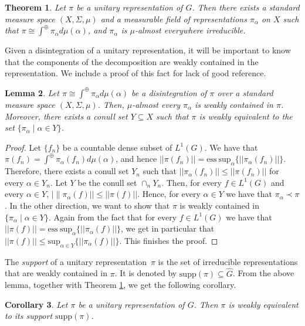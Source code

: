 \documentclass[12pt,reqno]{amsart}
\newtheorem{theorem}{Theorem}[section]
\newtheorem{lemma}[theorem]{Lemma}
\newtheorem{corollary}[theorem]{Corollary}
\theoremstyle{definition}
\begin{document}
\begin{theorem}\cite[Theorem~7.29-7.30]{Folland}\label{thm:disintegration of unirpes}
    Let $\pi$ be a unitary representation of $G$. Then there exists a standard measure space $(X,\Sigma,\mu)$ and a measurable field of representations $\pi_{\alpha}$ on $X$ such that $\pi \cong \int^{\oplus}\pi_{\alpha}d\mu(\alpha)$, and $\pi_\alpha$ is $\mu$-almost everywhere irreducible.
\end{theorem}
Given a disintegration of a unitary representation, it will be important to know that the components of the decomposition are weakly contained in the representation. We include a proof of this fact for lack of good reference.
\begin{lemma}\label{lemma:disintegratipon weakly contained}
    Let $\pi \cong \int^{\oplus}\pi_{\alpha}d\mu(\alpha)$ be a disintegration of $\pi$ over a standard measure space $(X, \Sigma, \mu)$. Then, $\mu$-almost every $\pi_\alpha$ is weakly contained in $\pi$. Moreover, there exists a conull set $Y \subseteq X$ such that $\pi$ is weakly equivalent to the set $\{\pi_\alpha \mid \alpha \in Y\}$. 
\end{lemma}
\begin{proof}
    Let $\{f_n\}$ be a countable dense subset of $L^1(G)$. We have that $\pi(f_n) = \int^{\oplus}\pi_\alpha(f_n)d\mu(\alpha)$, and hence $||\pi(f_n)||= \mathrm{ess} \ \mathrm{sup}_\alpha \{||\pi_\alpha(f_n)||\}$. Therefore, there exists a conull set $Y_n$ such that $||\pi_\alpha(f_n)|| \leq || \pi(f_n) ||$ for every $\alpha \in Y_n$. Let $Y$ be the conull set $\cap_n Y_n$. Then, for every $f \in L^1(G)$ and every $\alpha \in Y$, $|\| \pi_\alpha(f)|| \leq ||\pi(f)||$. Hence, for every $\alpha \in Y$ we have that $\pi_\alpha \prec \pi$. In the other direction, we want to show that $\pi$ is weakly contained in $\{\pi_\alpha \mid \alpha \in Y\}$. Again from the fact that for every $f \in L^1(G)$ we have that $||\pi(f)||= \mathrm{ess} \ \mathrm{sup}_\alpha \{||\pi_\alpha(f)||\}$, we get in particular that $||\pi(f)|| \leq \mathrm{sup}_{\alpha \in Y} \{||\pi_\alpha(f)||\}$. This finishes the proof.
\end{proof}
The \emph{support} of a unitary representation~$\pi$ is the set of irreducible representations that are weakly contained in $\pi$. It is denoted by $\mathrm{supp}(\pi) \subseteq \widehat{G}$. From the above lemma, together with Theorem \ref{thm:disintegration of unirpes}, we get the following corollary.
\begin{corollary}
    Let $\pi$ be a unitary representation of $G$. Then $\pi$ is weakly equivalent to its support $\mathrm{supp}(\pi)$.
\end{corollary}
\end{document}
